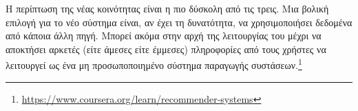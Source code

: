 Η περίπτωση της νέας κοινότητας είναι η πιο δύσκολη από τις τρεις. Μια βολική επιλογή για το νέο σύστημα είναι, αν έχει τη δυνατότητα, να χρησιμοποιήσει δεδομένα από κάποια άλλη πηγή. Μπορεί ακόμα στην αρχή της λειτουργίας του μέχρι να αποκτήσει αρκετές (είτε άμεσες είτε έμμεσες) πληροφορίες από τους χρήστες να λειτουργεί ως ένα μη προσωποποιημένο σύστημα παραγωγής συστάσεων.\footnote{\en \url{https://www.coursera.org/learn/recommender-systems}}
